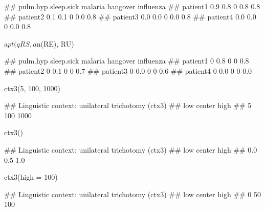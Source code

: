 \documentclass{article}\usepackage[]{graphicx}\usepackage[]{color}
\begin{document}
\begin{Schunk}
% --begin: "comp.quant.atleast"
\begin{Soutput}
##          pulm.hyp sleep.sick malaria hangover influenza
## patient1      0.9        0.8       0      0.8       0.8
## patient2      0.1        0.1       0      0.0       0.8
## patient3      0.0        0.0       0      0.0       0.8
## patient4      0.0        0.0       0      0.0       0.8
\end{Soutput}
%
% --end: "comp.quant.atleast"
\end{Schunk}

\begin{Schunk}
% --begin: "comp.quant.combined"
\begin{Sinput}
a$pt(qRS, a$n(RE), RU)
\end{Sinput}
\begin{Soutput}
##          pulm.hyp sleep.sick malaria hangover influenza
## patient1        0        0.8       0        0       0.8
## patient2        0        0.1       0        0       0.7
## patient3        0        0.0       0        0       0.6
## patient4        0        0.0       0        0       0.0
\end{Soutput}
%
% --end: "comp.quant.combined"
\end{Schunk}

\begin{Schunk}
% --begin: "ctx"
\begin{Sinput}
ctx3(5, 100, 1000)
\end{Sinput}
\begin{Soutput}
## Linguistic context: unilateral trichotomy (ctx3)
##    low center   high 
##      5    100   1000
\end{Soutput}
\begin{Sinput}
ctx3()
\end{Sinput}
\begin{Soutput}
## Linguistic context: unilateral trichotomy (ctx3)
##    low center   high 
##    0.0    0.5    1.0
\end{Soutput}
\begin{Sinput}
ctx3(high = 100)
\end{Sinput}
\begin{Soutput}
## Linguistic context: unilateral trichotomy (ctx3)
##    low center   high 
##      0     50    100
\end{Soutput}
%
% --end: "ctx"
\end{Schunk}
\end{document}
